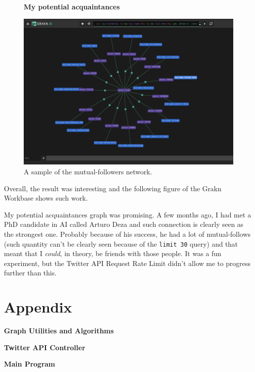 \documentclass[a4 paper,12pt]{article}
\begin{document}
\FloatBarrier
\begin{figure}
\centering
\textbf{My potential acquaintances}\par\medskip
    \includegraphics[scale=0.30]{figures/grakn-workbase.png}
\caption {A sample of the mutual-followers network.}
\end{figure}
\FloatBarrier

Overall, the result was interesting and the following figure of the Grakn Workbase shows such work.

My potential acquaintances graph was promising. A few months ago, I had met a PhD candidate in AI called Arturo Deza and such connection is clearly seen as the strongest one. Probably because of his success, he had a lot of mutual-follows (such quantity can't be clearly seen because of the \texttt{limit 30} query) and that meant that I \textit{could}, in theory, be friends with those people. It was a fun experiment, but the Twitter API Request Rate Limit didn't allow me to progress further than this.


\section{Appendix}

\FloatBarrier
\bigbreak
\noindent \textbf{Graph Utilities and Algorithms}\par\medskip
    
\FloatBarrier

\FloatBarrier

\bigbreak
\noindent \textbf{Twitter API Controller}\par\medskip
    
\FloatBarrier

\FloatBarrier
\bigbreak
\noindent \textbf{Main Program}\par\medskip
    
\FloatBarrier
\end{document}
